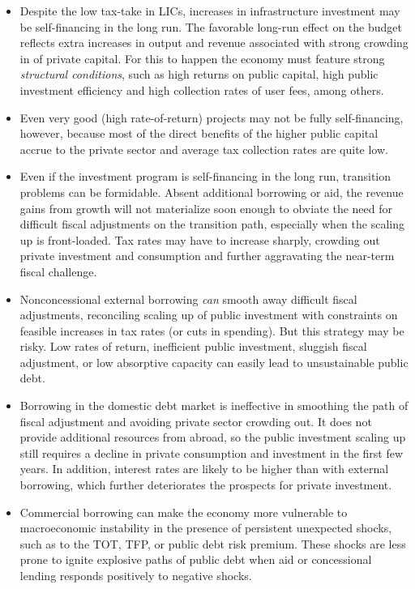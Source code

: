 \documentclass[11pt]{article}
\begin{document}
\begin{itemize}
\item Despite the low tax-take in LICs, increases in infrastructure
investment may be self-financing in the long run. The favorable long-run
effect on the budget reflects extra increases in output and revenue
associated with strong crowding in of private capital. For this to happen
the economy must feature strong \textit{structural conditions}, such as high
returns on public capital, high public investment efficiency and high
collection rates of user fees, among others.

\item Even very good (high rate-of-return) projects may not be fully
self-financing, however, because most of the direct benefits of the higher
public capital accrue to the private sector and average tax collection rates
are quite low.

\item Even if the investment program is self-financing in the long run,
transition problems can be formidable. Absent additional borrowing or aid,
the revenue gains from growth will not materialize soon enough to obviate
the need for difficult fiscal adjustments on the transition path, especially
when the scaling up is front-loaded. Tax rates may have to increase sharply,
crowding out private investment and consumption and further aggravating the
near-term fiscal challenge.

\item Nonconcessional external borrowing \textit{can }smooth away difficult
fiscal adjustments, reconciling scaling up of public investment with
constraints on feasible increases in tax rates (or cuts in spending). But
this strategy may be risky. Low rates of return, inefficient public
investment, sluggish fiscal adjustment, or low absorptive capacity can
easily lead to unsustainable public debt.

\item Borrowing in the domestic debt market is ineffective in smoothing the
path of fiscal adjustment and avoiding private sector crowding out. It does
not provide additional resources from abroad, so the public investment
scaling up still requires a decline in private consumption and investment in
the first few years. In addition, interest rates are likely to be higher
than with external borrowing, which further deteriorates the prospects for
private investment.

\item Commercial borrowing can make the economy more vulnerable to
macroeconomic instability in the presence of persistent unexpected shocks,
such as to the TOT, TFP, or public debt risk premium. These shocks are less
prone to ignite explosive paths of public debt when aid or concessional
lending responds positively to negative shocks.


\end{itemize}
\end{document}
